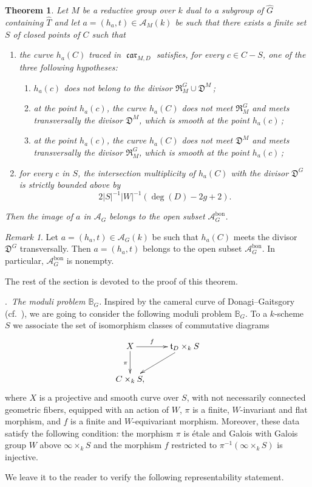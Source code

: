 \documentclass[12pt,a4paper,oneside,english,leqno]{smfart}
\makeatletter
\numberwithin{equation}{subsection}
\newcounter{theo}
\numberwithin{theo}{subsection}
\newenvironment{paragr}[1][]{\medskip\refstepcounter{subsection}%
  \par\noindent\hspace*{\parindent}\thesubsection.\ \emph{#1}%
  \@ifundefined{@empty}{}{}\ignorespaces}{\medskip}
\theoremstyle{plain}
\newtheorem{theorem}[theo]{Theorem}
\theoremstyle{definition}
\theoremstyle{remark}
\newtheorem{remark}[theo]{Remark}
\DeclareMathOperator{\car}{\mathfrak{car}}
\newcommand{\BBB}{\mathbb{B}}
\newcommand{\Ac}{\mathcal{A}}
\newcommand{\Gc}{\widehat{G}}
\newcommand{\Tc}{\widehat{T}}
\newcommand{\tgo}{\mathfrak{t}}
\makeatother
\begin{document}
\begin{theorem}\label{thm:9.1.3}
Let $M$ be a reductive group over $k$ dual to a subgroup of $\Gc$ containing $\Tc$ and let $a=(h_a,t)\in\Ac_M(k)$ be such that there exists a finite set $S$ of closed points of $C$ such that
\begin{enumerate}
\item the curve $h_a(C)$ traced in $\car_{M,D}$ satisfies, for every $c\in C-S$, one of the three following hypotheses:
  \begin{enumerate}
\item $h_a(c)$ does not belong to the divisor $\mathfrak{R}_M^G\cup\mathfrak{D}^M$\,; \item at the point $h_a(c)$, the curve $h_a(C)$ does not meet $\mathfrak{R}_M^G$ and meets transversally the divisor $\mathfrak{D}^M$, which is smooth at the point $h_a(c)$\,; \item at the point $h_a(c)$, the curve $h_a(C)$ does not meet $\mathfrak{D}^M$ and meets transversally the divisor $\mathfrak{R}_M^G$, which is smooth at the point $h_a(c)$\,;
  \end{enumerate}
\item for every $c$ in $S$, the intersection multiplicity of $h_a(C)$ with the divisor $\mathfrak{D}^G$ is strictly bounded above by
  \[
2|S|^{-1}|W|^{-1}(\deg(D)-2g+2).
  \]
\end{enumerate}
Then the image of $a$ in $\Ac_G$ belongs to the open subset $\Ac_G^{\mathrm{bon}}$.
\end{theorem}

\begin{remark}\label{thm:9.1.4}
Let $a=(h_a,t)\in\Ac_G(k)$ be such that $h_a(C)$ meets the divisor $\mathfrak{D}^G$ transversally. Then $a=(h_a,t)$ belongs to the open subset $\Ac_G^{\mathrm{bon}}$. In particular, $\Ac_G^{\mathrm{bon}}$ is nonempty.
\end{remark}

The rest of the section is devoted to the proof of this theorem.

\begin{paragr}[The moduli problem $\BBB_G$.]\label{S:9.2}
Inspired by the cameral curve of Donagi--Gaitsgory (cf.\ \cite{Donagi-Gaitsgory}), we are going to consider the following moduli problem $\BBB_G$. To a $k$-scheme $S$ we associate the set of isomorphism classes of commutative diagrams
\[
\xymatrix{
X \ar[r]^-{f} \ar[d]_{\pi} & \tgo_D\times_k S \ar[dl] \\
C\times_k S, }
\]
where $X$ is a projective and smooth curve over $S$, with not necessarily connected geometric fibers, equipped with an action of $W$, $\pi$ is a finite, $W$-invariant and flat morphism, and $f$ is a finite and $W$-equivariant morphism. Moreover, these data satisfy the following condition: the morphism $\pi$ is étale and Galois with Galois group $W$ above $\infty\times_k S$ and the morphism $f$ restricted to $\pi^{-1}(\infty\times_k S)$ is injective.

We leave it to the reader to verify the following representability statement.
\end{paragr}
\end{document}
